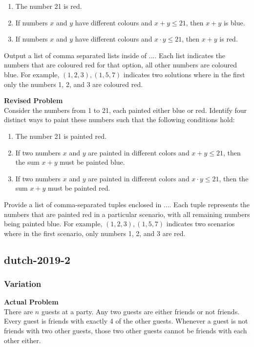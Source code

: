 \begin{enumerate}
\item The number 21 is red.
\item If numbers $x$ and $y$ have different colours and $x + y \leqslant 21$, then $x + y$ is blue.
\item If numbers $x$ and $y$ have different colours and $x \cdot y \leqslant 21$, then $x + y$ is red.
\end{enumerate}

Output a list of comma separated lists inside of $\boxed{...}$. Each list indicates the numbers that are coloured red for that option, all other numbers are coloured blue. For example, $\boxed{(1,2,3),(1,5,7)}$ indicates two solutions where in the first only the numbers 1, 2, and 3 are coloured red. 

\textbf{Revised Problem}\\
Consider the numbers from 1 to 21, each painted either blue or red. Identify four distinct ways to paint these numbers such that the following conditions hold:

\begin{enumerate}
\item The number 21 is painted red.
\item If two numbers $x$ and $y$ are painted in different colors and $x + y \leqslant 21$, then the sum $x + y$ must be painted blue.
\item If two numbers $x$ and $y$ are painted in different colors and $x \cdot y \leqslant 21$, then the sum $x + y$ must be painted red.
\end{enumerate}

Provide a list of comma-separated tuples enclosed in $\boxed{...}$. Each tuple represents the numbers that are painted red in a particular scenario, with all remaining numbers being painted blue. For example, $\boxed{(1,2,3),(1,5,7)}$ indicates two scenarios where in the first scenario, only numbers 1, 2, and 3 are red.

\subsection{dutch-2019-2}
\subsubsection{Variation}
\textbf{Actual Problem}\\
There are $n$ guests at a party. Any two guests are either friends or not friends. Every guest is friends with exactly 4 of the other guests. Whenever a guest is not friends with two other guests, those two other guests cannot be friends with each other either.

